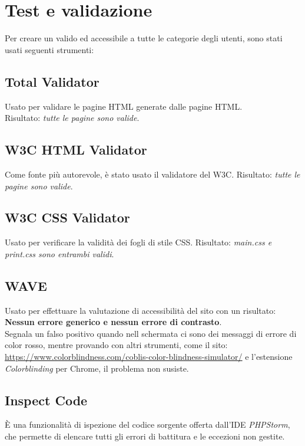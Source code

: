 \documentclass[1_relazione.tex]{subfiles}
\begin{document}
    \section{Test e validazione}\label{sec:test-e-validazione}
    Per creare un valido ed accessibile a tutte le categorie degli utenti, sono stati usati seguenti strumenti:

    \subsection{Total Validator}
    Usato per validare le pagine HTML generate dalle pagine HTML.\\ Risultato: \textit{tutte le pagine sono valide}.
    \subsection{W3C HTML Validator}
    Come fonte pi\`{u} autorevole, \`{e} stato usato il validatore del W3C. Risultato: \textit{tutte le pagine sono valide}.
    \subsection{W3C CSS Validator}
    Usato per verificare la validit\`{a} dei fogli di stile CSS. Risultato: \textit{main.css e print.css sono entrambi validi}.
    \subsection{WAVE}
    Usato per effettuare la valutazione di accessibilit\`{a} del sito con un risultato: \textbf{Nessun errore generico e nessun errore di contrasto}.
    \\Segnala un falso positivo quando nell schermata ci sono dei messaggi di errore di color rosso, mentre provando con altri strumenti, come il sito: \url{https://www.colorblindness.com/coblis-color-blindness-simulator/}
    e l'estensione \textit{Colorblinding} per Chrome, il problema non susiste.
    
    \subsection{Inspect Code}
    \`{E} una funzionalit\`{a} di ispezione del codice sorgente offerta dall'IDE \textit{PHPStorm}, che permette di elencare tutti gli errori di battitura e le eccezioni non gestite.
\end{document}

